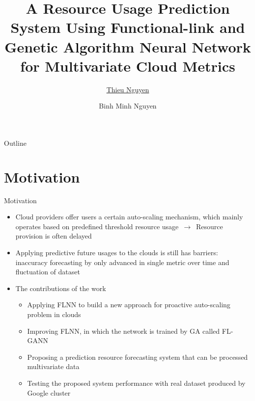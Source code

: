 \documentclass{beamer}
\title{\large A Resource Usage Prediction System Using Functional-link and Genetic Algorithm Neural Network for Multivariate Cloud Metrics}
\author{\small \underline{Thieu Nguyen} \and Binh Minh Nguyen}
\institute{ High Performance Computing Center\\ Hanoi University of Science and Technology, Hanoi, Vietnam}
\begin{document}
\begin{frame}
  \titlepage
\end{frame}

\begin{frame}{Outline}
  \tableofcontents
\end{frame}


\section{Motivation}
\begin{frame}{Motivation}
	\begin{itemize}
		\item {Cloud providers offer users a certain auto-scaling mechanism, which mainly operates based on predefined threshold resource usage $\,\to\,$ Resource provision is often delayed}
		\item {Applying predictive future usages to the clouds is still has barriers: inaccuracy forecasting by only advanced in single metric over time and fluctuation of dataset}
		\item {The contributions of the work}
		\begin{itemize}
			\item Applying FLNN to build a new approach for proactive auto-scaling problem in clouds
			\item Improving FLNN, in which the network is trained by GA called FL-GANN
			\item Proposing a prediction resource forecasting system that can be processed multivariate data
			\item Testing the proposed system performance with real dataset produced by Google cluster
			
		\end{itemize}
		
	\end{itemize}
\end{frame}
\end{document}

